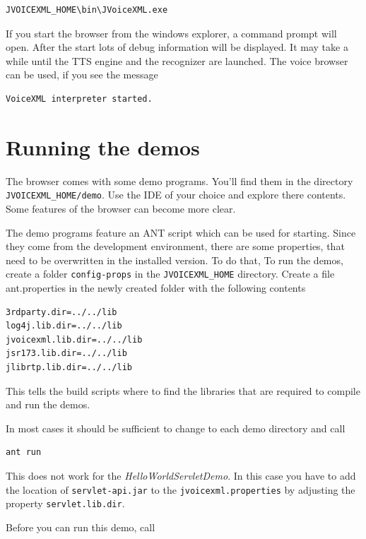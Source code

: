 \documentclass[11pt,a4paper]{article}
\begin{document}
\begin{lstlisting}
JVOICEXML_HOME\bin\JVoiceXML.exe
\end{lstlisting}

If you start the browser from the windows explorer, a command prompt will open.
After the start lots of debug information will be displayed.
It may take a while until the TTS engine and the recognizer are launched.
The voice browser can be used, if you see the message

\begin{lstlisting}
VoiceXML interpreter started.
\end{lstlisting}

\section{Running the demos}

The browser comes with some demo programs. You'll find them in the
directory \texttt{JVOICEXML\_HOME/demo}. Use the IDE of your choice
and explore there contents. Some features of the browser can 
become more clear.

The demo programs feature an ANT script which can be used for starting.
Since they come from the development environment, there are some
properties, that need to be overwritten in the installed version.
To do that, To run the demos, create a folder \texttt{config-props} in the
\texttt{JVOICEXML\_HOME} directory. Create a file ant.properties in the newly
created folder with the following contents

\begin{lstlisting}
3rdparty.dir=../../lib
log4j.lib.dir=../../lib
jvoicexml.lib.dir=../../lib
jsr173.lib.dir=../../lib
jlibrtp.lib.dir=../../lib
\end{lstlisting}

This tells the build scripts where to find the libraries that are required
to compile and run the demos.

In most cases it should be sufficient to change to each demo directory
and call

\begin{lstlisting}
ant run
\end{lstlisting}

This does not work for the \emph{HelloWorldServletDemo}. In this
case you have to add the location of \texttt{servlet-api.jar} to
the \texttt{jvoicexml.properties} by adjusting the property
\texttt{servlet.lib.dir}.

Before you can run this demo, call
\end{document}
